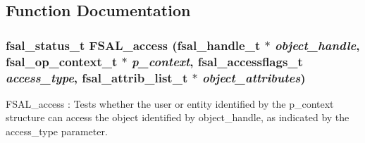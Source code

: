 \subsection{Function Documentation}
\subsubsection[{FSAL\_\-access}]{\setlength{\rightskip}{0pt plus 5cm}fsal\_\-status\_\-t FSAL\_\-access (fsal\_\-handle\_\-t $\ast$ {\em object\_\-handle}, \/  fsal\_\-op\_\-context\_\-t $\ast$ {\em p\_\-context}, \/  fsal\_\-accessflags\_\-t {\em access\_\-type}, \/  fsal\_\-attrib\_\-list\_\-t $\ast$ {\em object\_\-attributes})}\label{fsal__access_8c_a50fd5f13bbbdce0fd2279b34623b33a}


FSAL\_\-access : Tests whether the user or entity identified by the p\_\-context structure can access the object identified by object\_\-handle, as indicated by the access\_\-type parameter.

